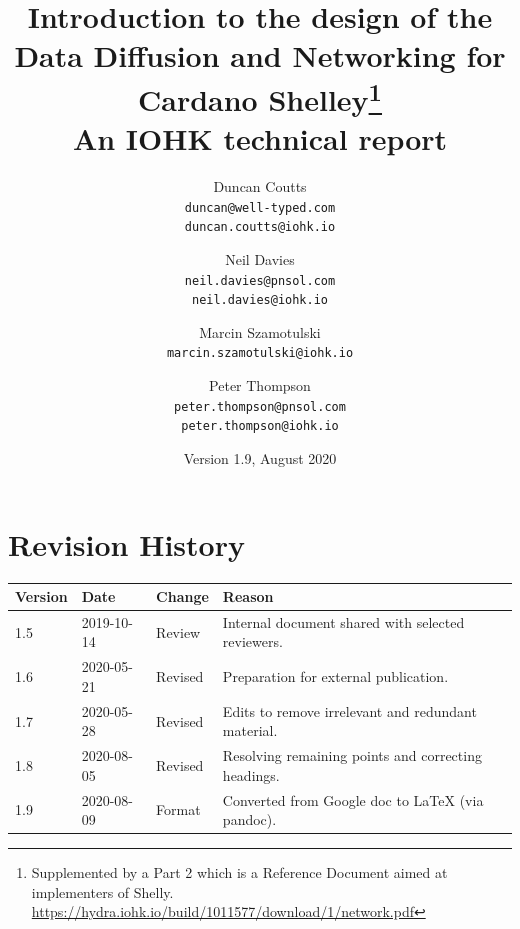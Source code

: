 \documentclass[11pt,a4paper]{article}
\begin{document}
\listoftodos

\title{Introduction to the design of the
       Data Diffusion and Networking for
       Cardano Shelley\footnote{Supplemented by a Part 2 which is a
       Reference Document aimed at implementers of Shelly.
  \href{https://hydra.iohk.io/build/1011577/download/1/network.pdf}{{https://hydra.iohk.io/build/1011577/download/1/network.pdf}}} \\
       {\large \sc An IOHK technical report}
  }
\date{Version 1.9, August 2020}
\author{Duncan Coutts      \\ {\small \texttt{duncan@well-typed.com}} \\
                              {\small \texttt{duncan.coutts@iohk.io}}
   \and Neil Davies        \\ {\small \texttt{neil.davies@pnsol.com}} \\
                              {\small \texttt{neil.davies@iohk.io}}
   \and Marcin Szamotulski \\ {\small \texttt{marcin.szamotulski@iohk.io}}
   \and Peter Thompson     \\ {\small \texttt{peter.thompson@pnsol.com}} \\
                              {\small \texttt{peter.thompson@iohk.io}}
   }

\maketitle

\tableofcontents
\listoftables

\section{Revision History}
\label{revision-history}

\begin{longtable}[]{@{}llll@{}}
\toprule
\textbf{Version} & \textbf{Date} & \textbf{Change} &
\textbf{Reason}\tabularnewline
\midrule
\endhead
1.5 & 2019-10-14 & Review & Internal document shared with selected reviewers.\\
1.6 & 2020-05-21 & Revised & Preparation for external publication.\\
1.7 & 2020-05-28 & Revised & Edits to remove irrelevant and redundant
material.\\
1.8 & 2020-08-05 & Revised & Resolving remaining points and correcting
headings.\\
1.9 & 2020-08-09 & Format & Converted from Google doc to LaTeX (via pandoc).\\
\bottomrule
\end{longtable}
\end{document}
